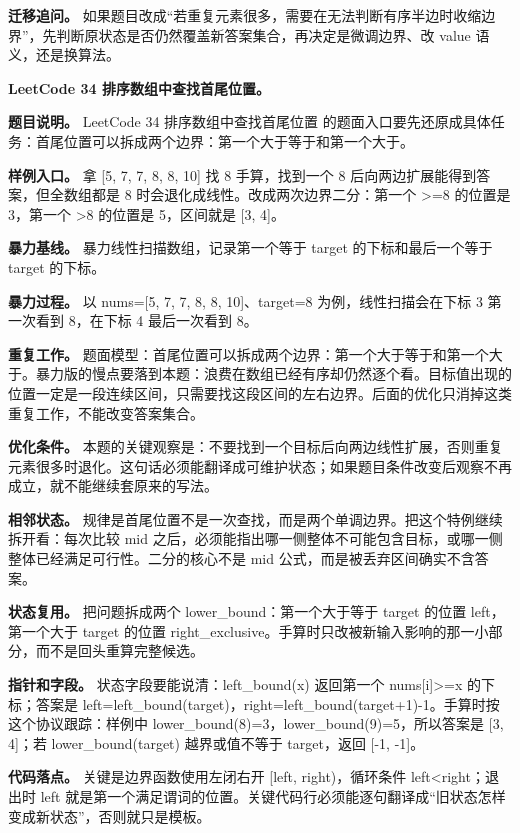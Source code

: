 \textbf{迁移追问。} 如果题目改成“若重复元素很多，需要在无法判断有序半边时收缩边界”，先判断原状态是否仍然覆盖新答案集合，再决定是微调边界、改 value 语义，还是换算法。

\noindent\textbf{LeetCode 34 排序数组中查找首尾位置。}

\textbf{题目说明。} LeetCode 34 排序数组中查找首尾位置 的题面入口要先还原成具体任务：首尾位置可以拆成两个边界：第一个大于等于和第一个大于。

\textbf{样例入口。} 拿 [5, 7, 7, 8, 8, 10] 找 8 手算，找到一个 8 后向两边扩展能得到答案，但全数组都是 8 时会退化成线性。改成两次边界二分：第一个 >=8 的位置是 3，第一个 >8 的位置是 5，区间就是 [3, 4]。

\textbf{暴力基线。} 暴力线性扫描数组，记录第一个等于 target 的下标和最后一个等于 target 的下标。

\textbf{暴力过程。} 以 nums=[5, 7, 7, 8, 8, 10]、target=8 为例，线性扫描会在下标 3 第一次看到 8，在下标 4 最后一次看到 8。

\textbf{重复工作。} 题面模型：首尾位置可以拆成两个边界：第一个大于等于和第一个大于。暴力版的慢点要落到本题：浪费在数组已经有序却仍然逐个看。目标值出现的位置一定是一段连续区间，只需要找这段区间的左右边界。后面的优化只消掉这类重复工作，不能改变答案集合。

\textbf{优化条件。} 本题的关键观察是：不要找到一个目标后向两边线性扩展，否则重复元素很多时退化。这句话必须能翻译成可维护状态；如果题目条件改变后观察不再成立，就不能继续套原来的写法。

\textbf{相邻状态。} 规律是首尾位置不是一次查找，而是两个单调边界。把这个特例继续拆开看：每次比较 mid 之后，必须能指出哪一侧整体不可能包含目标，或哪一侧整体已经满足可行性。二分的核心不是 mid 公式，而是被丢弃区间确实不含答案。

\textbf{状态复用。} 把问题拆成两个 lower\_bound：第一个大于等于 target 的位置 left，第一个大于 target 的位置 right\_exclusive。手算时只改被新输入影响的那一小部分，而不是回头重算完整候选。

\textbf{指针和字段。} 状态字段要能说清：left\_bound(x) 返回第一个 nums[i]>=x 的下标；答案是 left=left\_bound(target)，right=left\_bound(target+1)-1。手算时按这个协议跟踪：样例中 lower\_bound(8)=3，lower\_bound(9)=5，所以答案是 [3, 4]；若 lower\_bound(target) 越界或值不等于 target，返回 [-1, -1]。

\textbf{代码落点。} 关键是边界函数使用左闭右开 [left, right)，循环条件 left<right；退出时 left 就是第一个满足谓词的位置。关键代码行必须能逐句翻译成“旧状态怎样变成新状态”，否则就只是模板。


